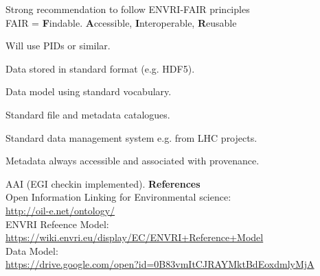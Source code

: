 \begin{frame}[fragile,t]
  \vspace{\mytopbit}
  {Strong recommendation to follow ENVRI-FAIR principles \\ }
FAIR = {\bf F}indable. {\bf A}ccessible, {\bf I}nteroperable, {\bf R}eusable
\bitm
\item Will use PIDs or similar.
\item Data stored in standard format (e.g. HDF5).
\item Data model using standard vocabulary.
\item Standard file and metadata catalogues.
\item Standard data management system e.g. from LHC projects.
\item Metadata always accessible and associated with provenance.
\item AAI (EGI checkin implemented).
\eitm
{\bf References \\}
{Open Information Linking for Environmental science:} \\
{\scriptsize \url{http://oil-e.net/ontology/}} \\
{ENVRI Refeence Model:} \\
{\scriptsize \url{https://wiki.envri.eu/display/EC/ENVRI+Reference+Model}} \\
{\ED Data Model:} \\
{\scriptsize \url{https://drive.google.com/open?id=0B83vmItCJRAYMktBdEoxdmlyMjA}}
\end{frame}

